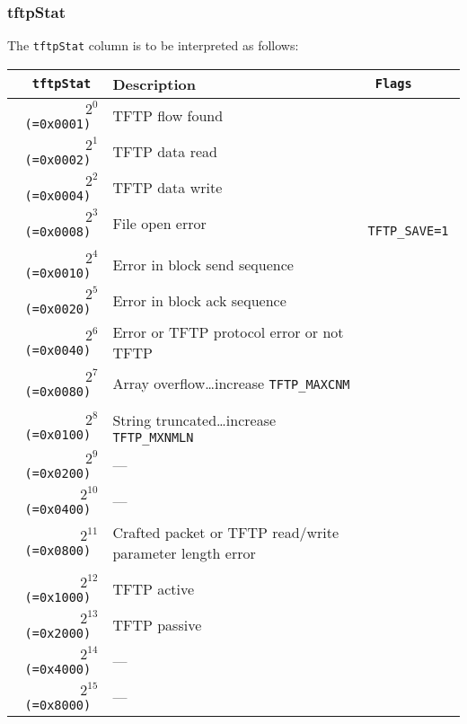 \documentclass[documentation]{subfiles}
\begin{document}
\subsubsection{tftpStat}\label{tftpStat}
The {\tt tftpStat} column is to be interpreted as follows:
\begin{longtable}{>{\tt}rl>{\tt\small}l}
    \toprule
    {\bf tftpStat}     & {\bf Description}                                        & {\bf Flags}\\
    \midrule\endhead%
    $2^{0}$  (=0x0001) & TFTP flow found                                          & \\
    $2^{1}$  (=0x0002) & TFTP data read                                           & \\
    $2^{2}$  (=0x0004) & TFTP data write                                          & \\
    $2^{3}$  (=0x0008) & File open error                                          & TFTP\_SAVE=1\\
    \\
    $2^{4}$  (=0x0010) & Error in block send sequence                             & \\
    $2^{5}$  (=0x0020) & Error in block ack sequence                              & \\
    $2^{6}$  (=0x0040) & Error or TFTP protocol error or not TFTP                 & \\
    $2^{7}$  (=0x0080) & Array overflow\ldots increase {\tt TFTP\_MAXCNM}         & \\
    \\
    $2^{8}$  (=0x0100) & String truncated\ldots increase {\tt TFTP\_MXNMLN}       & \\
    $2^{9}$  (=0x0200) & ---                                                      & \\
    $2^{10}$ (=0x0400) & ---                                                      & \\
    $2^{11}$ (=0x0800) & Crafted packet or TFTP read/write parameter length error & \\
    \\
    $2^{12}$ (=0x1000) & TFTP active                                              & \\
    $2^{13}$ (=0x2000) & TFTP passive                                             & \\
    $2^{14}$ (=0x4000) & ---                                                      & \\
    $2^{15}$ (=0x8000) & ---                                                      & \\
    \bottomrule
\end{longtable}
\end{document}
